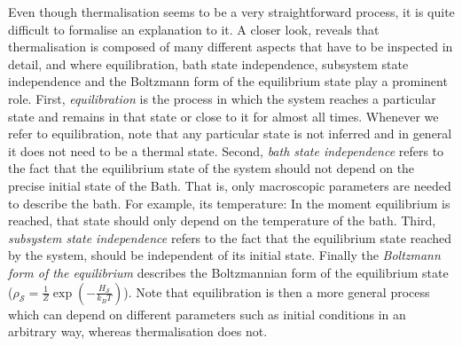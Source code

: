 \indent Even though thermalisation seems to be a very straightforward process, it is quite difficult to formalise an explanation to it. A closer look, reveals that thermalisation is composed of many different aspects that have to be inspected in detail, and where equilibration, bath state independence, subsystem state independence and the Boltzmann form of the equilibrium state play a prominent role\cite{linden_quantum_2009}. First, \textit{equilibration} is the process in which the system reaches a particular state and remains in that state or close to it for almost all times. Whenever we refer to equilibration, note that any particular state is not inferred and in general it does not need to be a thermal state. Second, \textit{bath state independence} refers to the fact that the equilibrium state of the system should not depend on the precise initial state of the Bath. That is, only macroscopic parameters are needed to describe the bath\cite{linden_quantum_2009}. For example, its temperature: In the moment equilibrium is reached, that state should only depend on the temperature of the bath. Third, \textit{subsystem state independence} refers to the fact that the equilibrium state reached by the system, should be independent of its initial state. Finally the \textit{Boltzmann form of the equilibrium} describes the Boltzmannian form of the equilibrium state ($\rho_{\mathcal{S}}=\frac{1}{Z}\operatorname{exp}(-\frac{H_{\mathcal{S}}}{k_B T})$). Note that equilibration is then a more general process which can depend on different parameters such as initial conditions in an arbitrary way, whereas thermalisation does not.\\
